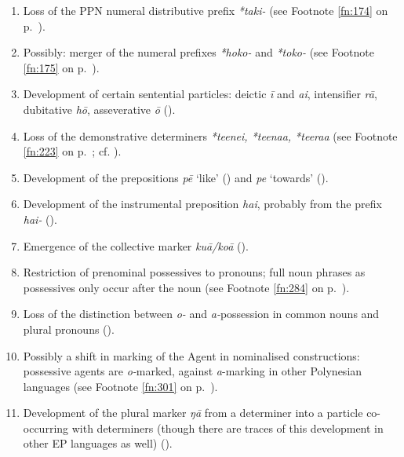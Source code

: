 \begin{enumerate}
\item 
Loss of the PPN numeral distributive prefix \textit{*taki-} (see Footnote \ref{fn:174} on p.~\pageref{fn:174}).

\item 
Possibly: merger of the numeral prefixes \textit{*hoko-} and \textit{*toko-} (see Footnote \ref{fn:175} on p.~\pageref{fn:175}).

\item 
Development of certain sentential particles: deictic \textit{{\ꞌ}ī} and \textit{{\ꞌ}ai}, intensifier \textit{rā}, dubitative \textit{hō}, asseverative \textit{{\ꞌ}ō} ().

\item 
Loss of the demonstrative determiners \textit{*teenei, *teenaa, *teeraa} (see Footnote \ref{fn:223} on p.~\pageref{fn:223}; cf. \citealt[44]{Pawley1966}).

\item 
Development of the prepositions \textit{pē} ‘like’ () and \textit{pe} ‘towards’ ().

\item 
Development of the instrumental preposition \textit{hai}, probably from the prefix \textit{hai-} ().

\item 
Emergence of the collective marker \textit{kuā}\textit{/koā} ().

\item 
Restriction of prenominal possessives to pronouns; full noun phrases as possessives only occur after the noun (see Footnote \ref{fn:284} on p.~\pageref{fn:284}).

\item 
Loss of the distinction between \textit{o-} and \textit{a-}possession in common nouns and plural pronouns ().

\item 
Possibly a shift in marking of the Agent in nominalised constructions: possessive agents are \textit{o-}marked, against \textit{a}{}-marking in other Polynesian languages (see Footnote \ref{fn:301} on p.~\pageref{fn:301}).

\item 
Development of the plural marker \textit{ŋā} from a determiner into a particle co-occur\-ring with determiners (though there are traces of this development in other EP languages as well) ().


\end{enumerate}
